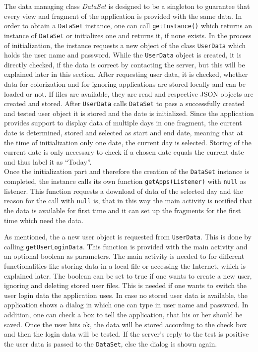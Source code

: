 The  data managing class \emph{DataSet} is designed to be a singleton to guarantee that every view and fragment of the application is provided with the same data. In order to obtain a \lstinline$DataSet$ instance, one can call \lstinline$getInstance()$ which returns an instance of \lstinline$DataSet$ or initializes one and returns it, if none exists. In the process of initialization, the instance requests a new object of the class \lstinline$UserData$ which holds the user name and password. While the \lstinline$UserData$ object is created, it is directly checked, if the data is correct by contacting the server, but this will be explained later in this section. After requesting user data, it is checked, whether data for colorization and for ignoring applications are stored locally and can be loaded or not. If files are available, they are read and respective JSON objects are created and stored. After \lstinline$UserData$ calls \lstinline$DataSet$ to pass a successfully created and tested user object it is stored and the date is initialized. Since the application provides support to display data of multiple days in one fragment, the current date is determined, stored and selected as start and end date, meaning that at the time of initialization only one date, the current day is selected. Storing of the current date is only necessary to check if a chosen date equals the current date and thus label it as ``Today''.\\
Once the initialization part and therefore the creation of the \lstinline$DataSet$ instance is completed, the instance calls its own function \lstinline$getApps(Listener)$ with \lstinline$null$ as listener. This function requests a download of data of the selected day and the reason for the call with \lstinline$null$ is, that in this way the main activity is notified that the data is available for first time and it can set up the fragments for the first time which need the data.

As mentioned,  the a new user object is requested from \lstinline$UserData$. This is done by calling \lstinline$getUserLoginData$. This function is provided with the main activity and an optional boolean as parameters. The main activity is needed to for different functionalities like storing data in a local file or accessing the Internet, which is explained later. The boolean can be set to true if one wants to create a new user, ignoring and deleting stored user files. This is needed if one wants to switch the user login data the application uses. In case no stored user data is available, the application shows a dialog in which one can type in user name and password. In addition, one can check a box to tell the application, that his or her should be saved. Once the user hits ok, the data will be stored according to the check box and then the login data will be tested. If the server's reply to the test is positive the user data is passed to the \lstinline$DataSet$, else the dialog is shown again.

